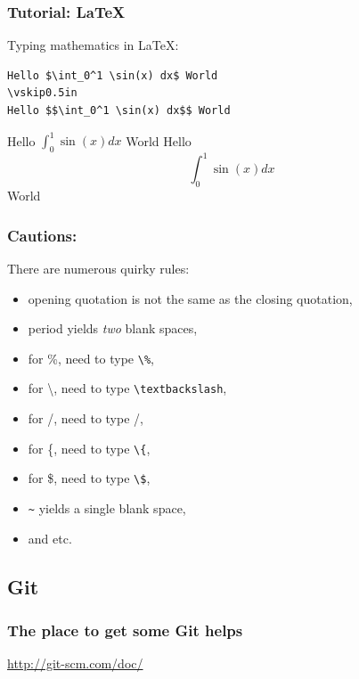 
\begin{frame}[fragile]
    \frametitle{Tutorial: \LaTeX}
    Typing mathematics in \LaTeX:
    \begin{lstlisting}
Hello $\int_0^1 \sin(x) dx$ World
\vskip0.5in
Hello $$\int_0^1 \sin(x) dx$$ World
    \end{lstlisting}
    \vskip0.1in
Hello $\int_0^1 \sin(x) dx$ World
\vskip0.5in
Hello $$\int_0^1 \sin(x) dx$$ World
\end{frame}

\begin{frame}[fragile]
    \frametitle{Cautions: \LaTeXs}
    There are numerous quirky \LaTeXs rules:
    \begin{itemize}
        \item opening quotation is not the same as the closing quotation,
        \item period yields \emph{two} blank spaces, 
        \item for \%, need to type \verb+\%+,
        \item for \textbackslash, need to type \verb+\textbackslash+,
        \item for /, need to type /,
        \item for \{, need to type \verb+\{+,
        \item for \$, need to type \verb+\$+,
        \item \verb+~+ yields a single blank space,
        \item and etc.
    \end{itemize}
\end{frame}


\subsection{Git}

\begin{frame}
    \frametitle{The place to get some Git helps}
    \begin{center}
        \href{http://git-scm.com/doc/}{http://git-scm.com/doc/}
    \end{center}
\end{frame}



